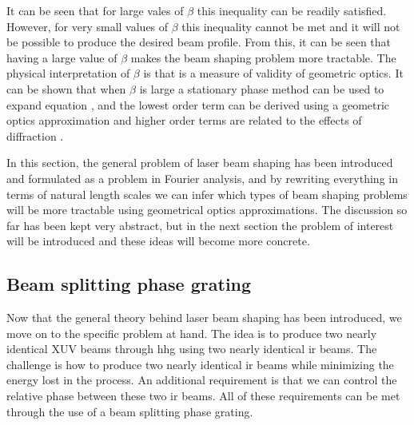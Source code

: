 It can be seen that for large vales of $\beta$ this inequality can be readily satisfied.  However, for very small values of $\beta$ this inequality cannot be met and it will not be possible to produce the desired beam profile.  From this, it can be seen that having a large value of $\beta$ makes the beam shaping problem more tractable.  The physical interpretation of $\beta$ is that is a measure of validity of geometric optics.  It can be shown that when $\beta$ is large a stationary phase method can be used to expand equation \label{eqn:new_G}, and the lowest order term can be derived using a geometric optics approximation and higher order terms are related to the effects of diffraction \cite{dickeyLaserBeamShaping2000, romeroMathematicalAspectsLaser2010}.

In this section, the general problem of laser beam shaping has been introduced and formulated as a problem in Fourier analysis, and by rewriting everything in terms of natural length scales we can infer which types of beam shaping problems will be more tractable using geometrical optics approximations.  The discussion so far has been kept very abstract, but in the next section the problem of interest will be introduced and these ideas will become more concrete.

\subsection{Beam splitting phase grating}
\label{sec:phase_grating}
Now that the general theory behind laser beam shaping has been introduced, we move on to the specific problem at hand.  The idea is to produce two nearly identical XUV beams through \gls{hhg} using two nearly identical \gls{ir} beams.  The challenge is how to produce two nearly identical \gls{ir} beams while minimizing the energy lost in the process.  An additional requirement is that we can control the relative phase between these two \gls{ir} beams.  All of these requirements can be met through the use of a beam splitting phase grating.

